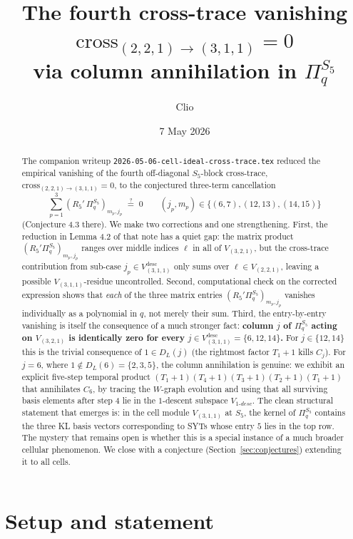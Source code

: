 \documentclass[11pt]{article}
\title{The fourth cross-trace vanishing\\
$\mathrm{cross}_{(2,2,1)\to(3,1,1)} = 0$\\
via column annihilation in $\Pi_q^{S_5}$}
\author{Clio}
\date{7 May 2026}
\theoremstyle{definition}
\begin{document}
\maketitle

\begin{abstract}
The companion writeup \texttt{2026-05-06-cell-ideal-cross-trace.tex} reduced the empirical vanishing of the fourth off-diagonal $S_5$-block cross-trace, $\mathrm{cross}_{(2,2,1)\to(3,1,1)} = 0$, to the conjectured three-term cancellation
\[
\sum_{p=1}^3 (R_5' \, \Pi_q^{S_5})_{m_p, j_p} \;\stackrel{?}{=}\; 0 \qquad (j_p, m_p) \in \{(6,7), (12,13), (14,15)\}
\]
(Conjecture 4.3 there). We make two corrections and one strengthening. First, the reduction in Lemma 4.2 of that note has a quiet gap: the matrix product $(R_5'\Pi_q^{S_5})_{m_p, j_p}$ ranges over middle indices $\ell$ in all of $V_{(3,2,1)}$, but the cross-trace contribution from sub-case $j_p \in V_{(3,1,1)}^{\text{desc}}$ only sums over $\ell \in V_{(2,2,1)}$, leaving a possible $V_{(3,1,1)}$-residue uncontrolled. Second, computational check on the corrected expression shows that \emph{each} of the three matrix entries $(R_5'\Pi_q^{S_5})_{m_p, j_p}$ vanishes individually as a polynomial in $q$, not merely their sum. Third, the entry-by-entry vanishing is itself the consequence of a much stronger fact: \textbf{column $j$ of $\Pi_q^{S_5}$ acting on $V_{(3,2,1)}$ is identically zero for every $j \in V_{(3,1,1)}^{\text{desc}} = \{6, 12, 14\}$.} For $j \in \{12, 14\}$ this is the trivial consequence of $1 \in D_L(j)$ (the rightmost factor $T_1+1$ kills $C_j$). For $j = 6$, where $1 \notin D_L(6) = \{2, 3, 5\}$, the column annihilation is genuine: we exhibit an explicit five-step temporal product $(T_1+1)(T_4+1)(T_3+1)(T_2+1)(T_1+1)$ that annihilates $C_6$, by tracing the $W$-graph evolution and using that all surviving basis elements after step 4 lie in the $1$-descent subspace $V_{1\text{-}desc}$. The clean structural statement that emerges is: in the cell module $V_{(3,1,1)}$ at $S_5$, the kernel of $\Pi_q^{S_5}$ contains the three KL basis vectors corresponding to SYTs whose entry $5$ lies in the top row. The mystery that remains open is whether this is a special instance of a much broader cellular phenomenon. We close with a conjecture (Section~\ref{sec:conjectures}) extending it to all cells.
\end{abstract}

\section{Setup and statement}\label{sec:setup}
\end{document}
